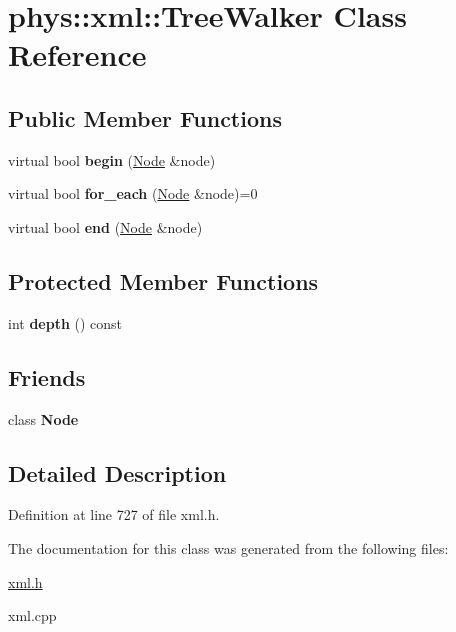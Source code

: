 \hypertarget{classphys_1_1xml_1_1TreeWalker}{
\section{phys::xml::TreeWalker Class Reference}
\label{d5/d8d/classphys_1_1xml_1_1TreeWalker}
}
\subsection*{Public Member Functions}
\begin{DoxyCompactItemize}
\item 
\hypertarget{classphys_1_1xml_1_1TreeWalker_a9f470ce9aa667b78a0281d5f87d09e0e}{
virtual bool {\bfseries begin} (\hyperlink{classphys_1_1xml_1_1Node}{Node} \&node)}
\label{d5/d8d/classphys_1_1xml_1_1TreeWalker_a9f470ce9aa667b78a0281d5f87d09e0e}

\item 
\hypertarget{classphys_1_1xml_1_1TreeWalker_a7fc883fd9b8eeff896c8822cf5b514d3}{
virtual bool {\bfseries for\_\-each} (\hyperlink{classphys_1_1xml_1_1Node}{Node} \&node)=0}
\label{d5/d8d/classphys_1_1xml_1_1TreeWalker_a7fc883fd9b8eeff896c8822cf5b514d3}

\item 
\hypertarget{classphys_1_1xml_1_1TreeWalker_a1486c30615d1de6622f997c28594aeae}{
virtual bool {\bfseries end} (\hyperlink{classphys_1_1xml_1_1Node}{Node} \&node)}
\label{d5/d8d/classphys_1_1xml_1_1TreeWalker_a1486c30615d1de6622f997c28594aeae}

\end{DoxyCompactItemize}
\subsection*{Protected Member Functions}
\begin{DoxyCompactItemize}
\item 
\hypertarget{classphys_1_1xml_1_1TreeWalker_ab2693802beae6312239507a679e2624a}{
int {\bfseries depth} () const }
\label{d5/d8d/classphys_1_1xml_1_1TreeWalker_ab2693802beae6312239507a679e2624a}

\end{DoxyCompactItemize}
\subsection*{Friends}
\begin{DoxyCompactItemize}
\item 
\hypertarget{classphys_1_1xml_1_1TreeWalker_a6db9d28bd448a131448276ee03de1e6d}{
class {\bfseries Node}}
\label{d5/d8d/classphys_1_1xml_1_1TreeWalker_a6db9d28bd448a131448276ee03de1e6d}

\end{DoxyCompactItemize}


\subsection{Detailed Description}


Definition at line 727 of file xml.h.



The documentation for this class was generated from the following files:\begin{DoxyCompactItemize}
\item 
\hyperlink{xml_8h}{xml.h}\item 
xml.cpp\end{DoxyCompactItemize}
